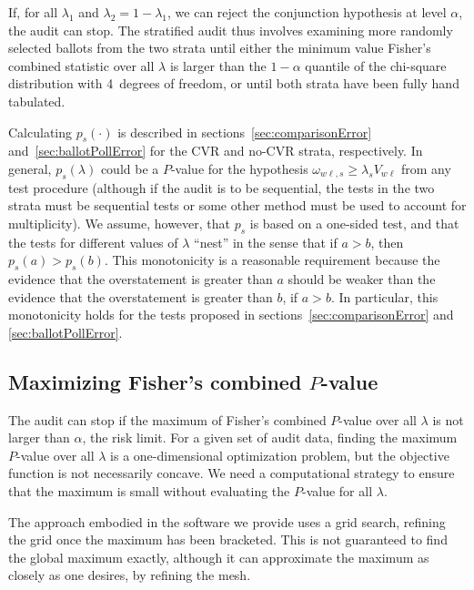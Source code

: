 \documentclass[runningheads]{llncs}
\begin{document}
If, for all $\lambda_1$ and $\lambda_2 = 1- \lambda_1$, we can reject the conjunction
hypothesis at level $\alpha$, the audit can stop.
The stratified audit thus involves examining more randomly selected ballots from the two strata until 
either the minimum value Fisher's combined statistic over all $\lambda$ 
is larger than the $1-\alpha$ quantile of the chi-square
distribution with 4~degrees of freedom, or until both strata have been fully hand tabulated.

Calculating $p_s(\cdot)$ is described in
sections~\ref{sec:comparisonError} and~\ref{sec:ballotPollError} for the CVR and no-CVR strata,
respectively.
In general, $p_s(\lambda)$ could be a $P$-value for the hypothesis
$\omega_{w\ell,s} \ge \lambda_s V_{w\ell}$ from any test procedure (although
if the audit is to be sequential, the tests in the two strata must be sequential tests or
some other method must be used to account for multiplicity). 
We assume, however, that $p_s$ is based on a one-sided test, and that the tests
for different values of $\lambda$ ``nest'' in the sense that if $a > b$,
then $p_s(a) > p_s(b)$.
This monotonicity is a reasonable requirement because the evidence that the overstatement
is greater than $a$ should be weaker than the evidence that the overstatement is greater than
$b$, if $a > b$.
In particular, this monotonicity holds for the tests proposed in sections~\ref{sec:comparisonError}
and \ref{sec:ballotPollError}.

\subsection{Maximizing Fisher's combined $P$-value}
The audit can stop if the maximum of Fisher's combined $P$-value over all
$\lambda$ is not larger than $\alpha$, the risk limit.
For a given set of audit data, 
finding the maximum $P$-value over all $\lambda$
is a one-dimensional optimization problem, but the objective function is not necessarily concave.
We need a computational strategy to ensure that the maximum is small
without evaluating the $P$-value for all $\lambda$.

The approach embodied in the software we provide uses a grid search, refining the
grid once the maximum has been bracketed.
This is not guaranteed to find the global maximum exactly, although it can approximate 
the maximum as closely as one desires, by refining the mesh.
\end{document}

